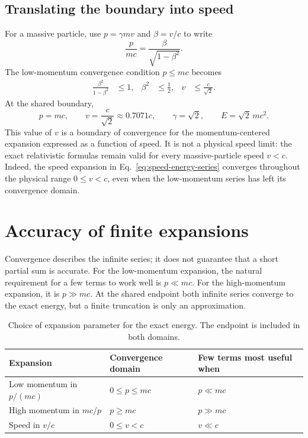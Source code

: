 \documentclass[12pt]{article}
\begin{document}
\subsection{Translating the boundary into speed}

For a massive particle, use $p=\gamma mv$ and $\beta=v/c$ to write
\begin{equation}
  \frac{p}{mc}=\frac{\beta}{\sqrt{1-\beta^2}}.
  \label{eq:p-beta}
\end{equation}
The low-momentum convergence condition $p\leq mc$ becomes
\begin{align}
  \frac{\beta^2}{1-\beta^2}&\leq1,
  &\beta^2&\leq\frac{1}{2},
  &v&\leq\frac{c}{\sqrt{2}}.
  \label{eq:velocity-boundary}
\end{align}
At the shared boundary,
\begin{equation}
  p=mc,
  \qquad
  v=\frac{c}{\sqrt{2}}\approx0.7071c,
  \qquad
  \gamma=\sqrt{2},
  \qquad
  E=\sqrt{2}\,mc^2.
  \label{eq:boundary-values}
\end{equation}
This value of $v$ is a boundary of convergence for the momentum-centered expansion expressed as a function of speed. It is not a physical speed limit: the exact relativistic formulas remain valid for every massive-particle speed $v<c$. Indeed, the speed expansion in Eq.~\eqref{eq:speed-energy-series} converges throughout the physical range $0\leq v<c$, even when the low-momentum series has left its convergence domain.

\section{Accuracy of finite expansions}

Convergence describes the infinite series; it does not guarantee that a short partial sum is accurate. For the low-momentum expansion, the natural requirement for a few terms to work well is $p\ll mc$. For the high-momentum expansion, it is $p\gg mc$. At the shared endpoint both infinite series converge to the exact energy, but a finite truncation is only an approximation.

\begin{table}[ht]
  \centering
  \caption{Choice of expansion parameter for the exact energy. The endpoint is included in both domains.}
  \label{tab:expansions}
  \begin{tabular}{lll}
    \toprule
    Expansion & Convergence domain & Few terms most useful when \\
    \midrule
    Low momentum in $p/(mc)$ & $0\leq p\leq mc$ & $p\ll mc$ \\
    High momentum in $mc/p$ & $p\geq mc$ & $p\gg mc$ \\
    Speed in $v/c$ & $0\leq v<c$ & $v\ll c$ \\
    \bottomrule
  \end{tabular}
\end{table}
\end{document}
